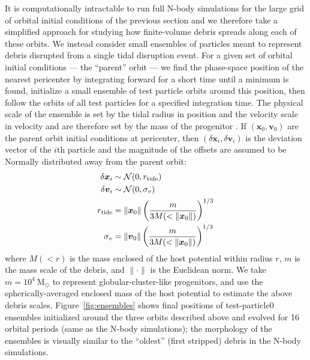 \documentclass[letterpaper,12pt,preprint]{aastex}
\newcommand{\msun}{\ensuremath{\mathrm{M}_\odot}}
\newcommand{\bs}[1]{\boldsymbol{#1}}
\begin{document}
It is computationally intractable to run full N-body simulations for the large grid of orbital initial conditions of the previous section and we therefore take a simplified approach for studying how finite-volume debris spreads along each of these orbits. We instead consider small ensembles of particles meant to represent debris disrupted from a single tidal disruption event. For a given set of orbital initial conditions --- the ``parent'' orbit --- we find the phase-space position of the nearest pericenter by integrating forward for a short time until a minimum is found, initialize a small ensemble of test particle orbits around this position, then follow the orbits of all test particles for a specified integration time. The physical scale of the ensemble is set by the tidal radius in position and the velocity scale in velocity and are therefore set by the mass of the progenitor \citep[e.g.,][]{johnston98, apw14}. If $(\bs{x}_0,\bs{v}_0)$ are the parent orbit initial conditions at pericenter, then $(\delta\bs{x}_i,\delta\bs{v}_i)$ is the deviation vector of the $i$th particle and the magnitude of the offsets are assumed to be Normally distributed away from the parent orbit:
\begin{align}
	\delta\bs{x}_i &\sim \mathcal{N}(0, r_{\rm tide})\\
	\delta\bs{v}_i &\sim \mathcal{N}(0, \sigma_v)\\
	r_{\rm tide} &= \|\bs{x}_0\| \left(\frac{m}{3M(<\|\bs{x}_0\|)}\right)^{1/3} \\
	\sigma_v &= \|\bs{v}_0\|\left(\frac{m}{3M(<\|\bs{x}_0\|)}\right)^{1/3} 
\end{align}
where $M(<r)$ is the mass enclosed of the host potential within radius $r$, $m$ is the mass scale of the debris, and $\|\cdot \|$ is the Euclidean norm. We take $m=10^4~\msun$ to represent globular-cluster-like progenitors, and use the spherically-averaged enclosed mass of the host potential to estimate the above debris scales. Figure~\ref{fig:ensembles} shows final positions of test-particle0 ensembles initialized around the three orbits described above and evolved for 16 orbital periods (same as the N-body simulations); the morphology of the ensembles is visually similar to the ``oldest'' (first stripped) debris in the N-body simulations.
\end{document}
